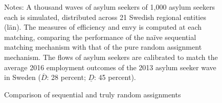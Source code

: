 \documentclass[12pt,fleqn]{article}
\begin{document}
\begin{center}
\begin{figure}
	\caption{Comparison of sequential and truly random assignments \label{FIG-bad_assignments}}
	\begin{center}


	\end{center}
		{\scriptsize \vspace{-1em}
	\begin{singlespace}
		{\sc Notes:} A thousand waves of asylum seekers of 1,000 asylum seekers each is simulated, distributed across 21 Swedish regional entities (l{\"a}n). The measures of efficiency and envy is computed at each matching, comparing the performance of the na\"{i}ve sequential matching mechanism with that of the pure random assignment mechanism. The flows of asylum seekers are calibrated to match the average 2016 employment outcomes of the 2013 asylum seeker wave in Sweden ($\overline{D}$: 28 percent; $\underline{D}$: 45 percent).
	\end{singlespace}
	 }
\end{figure}
\end{center}
\end{document}
